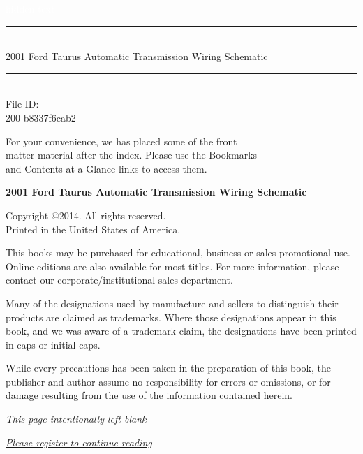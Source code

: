 \documentclass{book}
\newcommand{\HRule}{\rule{\linewidth}{2mm}}
\begin{document}
\begin{titlepage}

\begin{flushright}
\textcolor{white}{hidden text}

\vspace{7cm}

\HRule \\[0.4cm]
{\large 2001 Ford Taurus Automatic Transmission Wiring Schematic }\\[0.4cm]
\HRule \\[1.5cm]

\large{File ID:}\\
\small{ 200-b8337f6cab2 }

\end{flushright}

\vfill

\begin{flushright}
\footnotesize{ For your convenience, we has placed some of the front \\
matter material after the index. Please use the Bookmarks \\
and Contents at a Glance links to access them. }
\end{flushright}

\end{titlepage}
\noindent
{\textbf {\footnotesize 2001 Ford Taurus Automatic Transmission Wiring Schematic }}

\vspace{6pt}

\noindent
\scriptsize{Copyright @2014. All rights reserved. \\Printed in the United
  States of America.}

\noindent
\scriptsize{This books may be purchased for educational, business or
  sales promotional use. Online editions are also available for most
  titles. For more information, please contact our
  corporate/institutional sales department.}

\vfill

\noindent
\scriptsize{Many of the designations used by manufacture and sellers
  to distinguish their products are claimed as trademarks. Where those
  designations appear in this book, and we was aware of a trademark
  claim, the designations have been printed in caps or initial caps.}

\noindent
\scriptsize{While every precautions has been taken in the preparation of
  this book, the publisher and author assume no responsibility for
  errors or omissions, or for damage resulting from the use of the
  information contained herein.}

\clearpage

\noindent
\begin{center}
{\normalsize \emph{This page intentionally left blank}}
\end{center}

\clearpage

\noindent
{\color{blue}
\emph{
\Large{
\underline{
\href{http://www.google.com}{Please register to continue reading}
}}}}
\end{document}
